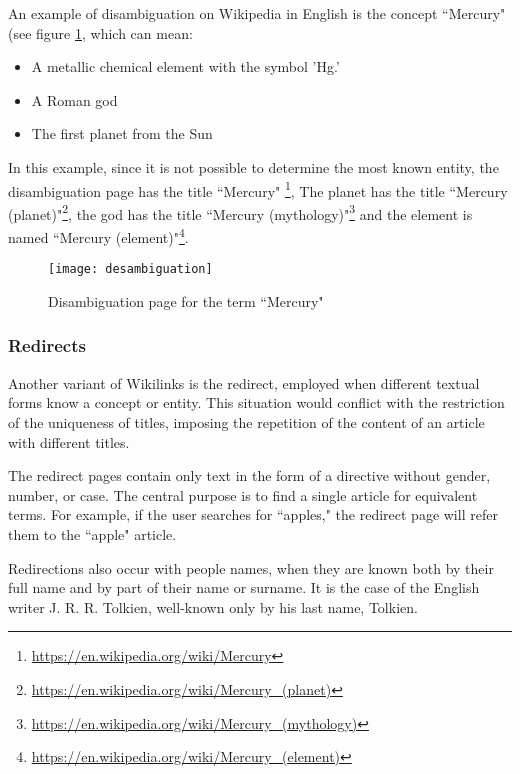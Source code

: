An example of disambiguation on Wikipedia in English is the concept ``Mercury" (see figure \ref{fig:mercury-desambiguation}, which can mean:

 \begin {itemize}
 \item A metallic chemical element with the symbol 'Hg.'
 \item A Roman god
 \item The first planet from the Sun
 \end {itemize}


 In this example, since it is not possible to determine the most known entity,  the disambiguation page has the title ``Mercury" \footnote{\url{https://en.wikipedia.org/wiki/Mercury}}, The planet has the title ``Mercury (planet)"\footnote{\url{https://en.wikipedia.org/wiki/Mercury_(planet)}}, the god has the title ``Mercury (mythology)"\footnote{\url{https://en.wikipedia.org/wiki/Mercury_(mythology)}} and the element is named ``Mercury (element)"\footnote{\url{https://en.wikipedia.org/wiki/Mercury_(element)}}.

\begin{figure}[!h]
\centering
  \texttt{[image: desambiguation]}
  \caption{Disambiguation page for the term ``Mercury"}
  \label{fig:mercury-desambiguation}
\end{figure}


\subsubsection{\hspace*{3pt} Redirects}

Another variant of Wikilinks is the redirect, employed when different textual forms know a concept or entity. This situation would conflict with the restriction of the uniqueness of titles, imposing the repetition of the content of an article with different titles. 

The redirect pages contain only text in the form of a directive without gender, number, or case. The central purpose is to find a single article for equivalent terms. For example, if the user searches for ``apples," the redirect page will refer them to the ``apple" article. 

Redirections also occur with people names, when they are known both by their full name and by part of their name or surname. It is the case of the English writer  J. R. R. Tolkien, well-known only by his last name, Tolkien.


